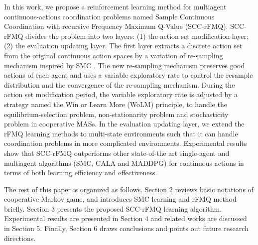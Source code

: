 \documentclass[journal,transmag]{IEEEtran}
\begin{document}





In this work, we propose a reinforcement learning method for multiagent continuous-actions coordination problems named Sample Continuous Coordination with recursive Frequency Maximum Q-Value (SCC-rFMQ). SCC-rFMQ divides the problem into two layers: (1) the action set modification layer; (2) the evaluation updating layer. The first layer extracts a discrete action set from the original continuous action spaces by a variation of re-sampling mechanism inspired by SMC \cite{Lazaric2007Reinforcement}. The new re-sampling mechanism preserves good actions of each agent and uses a variable exploratory rate to control the resample distribution and the convergence of the re-sampling mechanism. During the action set modification period, the variable exploratory rate is adjusted by a strategy named the Win or Learn More (WoLM) principle, to handle the equilibrium-selection problem, non-stationarity problem and stochasticity problem in cooperative MASs. In the evaluation updating layer, we extend the rFMQ learning methods \cite{Matignon2012} to multi-state environments such that it can handle coordination problems in more complicated environments. Experimental results show that SCC-rFMQ outperforms other state-of-the art single-agent and multiagent algorithms (SMC, CALA and MADDPG) for continuous actions in terms of both learning efficiency and effectiveness. %


The rest of this paper is organized as follows. Section 2 reviews basic notations of cooperative Markov game, and introduces SMC learning and rFMQ method briefly. Section 3 presents the proposed SCC-rFMQ learning algorithm. Experimental results are presented in Section 4 and  related works are discussed in Section 5. Finally, Section 6 draws conclusions and points out future research directions.
\end{document}
